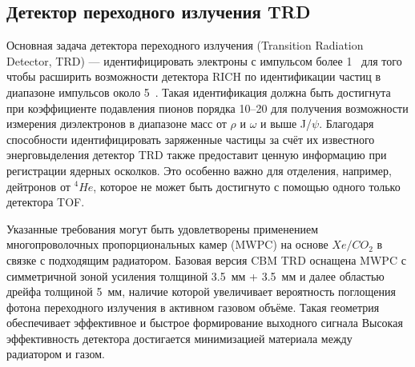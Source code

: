 
\subsection{Детектор переходного излучения TRD}\label{sec:secTRD}

Основная задача детектора переходного излучения (Transition Radiation Detector, TRD) --- идентифицировать электроны с импульсом более 1~\GeVoverC{} для того чтобы расширить возможности детектора RICH по идентификации частиц в диапазоне импульсов около 5~\GeVoverC{}.
Такая идентификация должна быть достигнута при коэффициенте подавления пионов порядка 10--20 для получения возможности измерения диэлектронов в диапазоне масс от $\rho$ и $\omega$ и выше J/$\psi$.
Благодаря способности идентифицировать заряженные частицы за счёт их известного энерговыделения детектор TRD также предоставит ценную информацию при регистрации ядерных осколков.
Это особенно важно для отделения, например, дейтронов от $ ^{4}He $, которое не может быть достигнуто с помощью одного только детектора TOF.


Указанные требования могут быть удовлетворены применением многопроволочных пропорциональных камер (MWPC) на основе $ Xe/CO_{2} $ в связке с подходящим радиатором. Базовая версия CBM TRD оснащена MWPC с симметричной зоной усиления толщиной 3.5~мм + 3.5~мм и далее областью дрейфа толщиной 5~мм, наличие которой увеличивает вероятность поглощения фотона переходного излучения в активном газовом объёме. Такая геометрия обеспечивает эффективное и быстрое формирование выходного сигнала
Высокая эффективность детектора достигается минимизацией материала между радиатором и газом.

